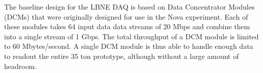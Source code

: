 The baseline design for the LBNE DAQ \cite{DAQ_CD1}
is based on Data Concentrator Modules (DCMs) 
that were originally designed for use in the Nova experiment.
Each of these modules takes 64 input data data streams of 20 Mbps and 
combine them into a single stream of 1 Gbps. 
The total throughput of a DCM module is limited to 60 Mbytes/second.
A single DCM module is thus able to handle enough data to readout the
entire 35 ton prototype, although without a large amount of headroom.

